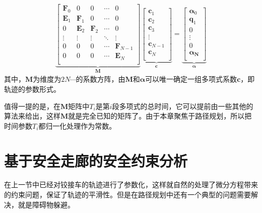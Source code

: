 \documentclass[master,academic]{ysuthesis} %
\begin{document}
		\begin{equation}
			\begin{aligned}
				\underbrace{\begin{bmatrix}
					\bm{F}_0&		0&		0&		\cdots&		0\\
					\bm{E}_1&		\bm{F}_1&		0&		\cdots&		0\\
					0&		\bm{E}_2&		\bm{F}_2&		\cdots&		0\\
					\vdots&		\vdots&		\vdots&		\ddots&		\vdots\\
					0&		0&		0&		\cdots&		\bm{F}_{N-1}\\
					0&		0&		0&		\cdots&		\bm{E}_N\\
				\end{bmatrix}}_{\bm{M}}
				\underbrace{ \begin{bmatrix}
					\bm{c}_1\\
					\bm{c}_2\\
					\bm{c}_3\\
					\vdots\\
					\bm{c}_{N-1}\\
					\bm{c}_N\\
				\end{bmatrix}}_{\bm{c}} =
				\underbrace{\begin{bmatrix}
					\bm{\alpha}_0\\
					\bm{q}_1\\
					0\\
					\vdots\\
					0\\
					\bm{\alpha_N}\\
				\end{bmatrix}}_{\bm{\alpha}} 
			\end{aligned}
			\label{eq:minco参数化}
		\end{equation}
		其中，$\bm{M}$为维度为$2N\cdots$的系数方阵，由$\bm{M}$和$\bm{\alpha}$可以唯一确定一组多项式系数$\bm{c}$，即轨迹的参数形式。

		值得一提的是，在$\bm{M}$矩阵中$T_i$是第$i$段多项式的总时间，它可以提前由一些其他的算法来给出，这样$\bm{M}$就是完全已知的矩阵了。由于本章聚焦于路径规划，所以把时间参数$T_i$都归一化处理作为常数。
	
	\section{基于安全走廊的安全约束分析}
	在上一节中已经对铰接车的轨迹进行了参数化，这样就自然的处理了微分方程带来的约束问题，保证了轨迹的平滑性。但是在路径规划中还有一个典型的问题需要解决，就是障碍物躲避。
	
\end{document}
